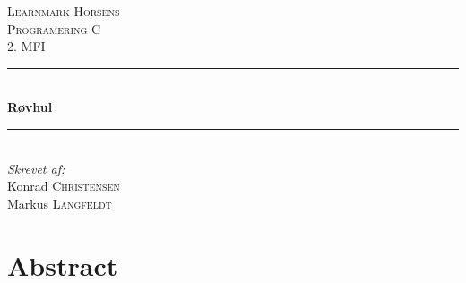 \documentclass[12pt]{article}
\begin{document}
\begin{titlepage}

	\newcommand{\HRule}{\rule{\linewidth}{0.5mm}}

	\center


	\textsc{\LARGE Learnmark Horsens}\\[1.5cm] %
	\textsc{\Large Programering C}\\[0.5cm] %
	\textsc{\large 2. MFI}\\[0.5cm] %


	\HRule \\[0.4cm]
	{ \huge \bfseries R\o vhul}\\[0.4cm]
	\HRule \\[1.5cm]


	\Large \emph{Skrevet af:}\\
	Konrad \textsc{Christensen}\\
	Markus \textsc{Langfeldt}\\[3cm]


	\vfill

\end{titlepage}

\pagebreak


\tableofcontents

\vfill

\pagebreak


\section{Abstract}
\end{document}
